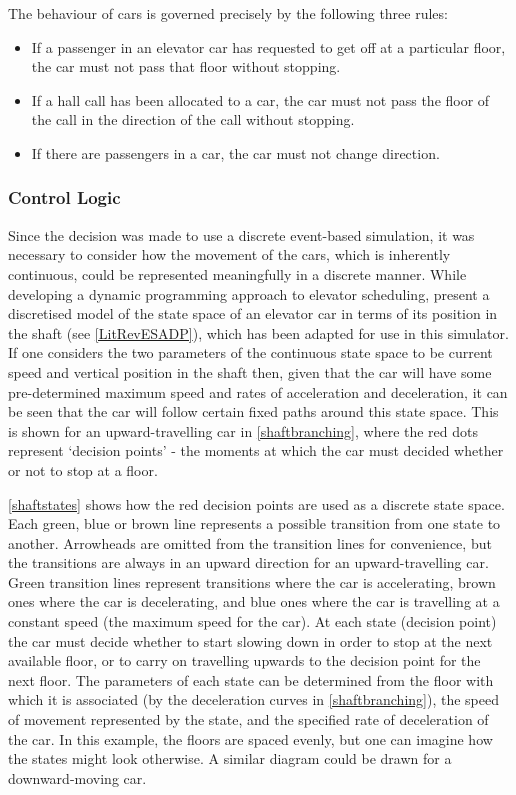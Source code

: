 \documentclass{UoYCSproject}
\begin{document}
The behaviour of cars is governed precisely by the following three rules:
\begin{itemize}
	\item If a passenger in an elevator car has requested to get off at a particular floor, the car must not pass that floor without stopping.
	\item If a hall call has been allocated to a car, the car must not pass the floor of the call in the direction of the call without stopping.
	\item If there are passengers in a car, the car must not change direction.
\end{itemize}

\subsubsection{Control Logic}

Since the decision was made to use a discrete event-based simulation, it was necessary to consider how the movement of the cars, which is inherently continuous, could be represented meaningfully in a discrete manner.  While developing a dynamic programming approach to elevator scheduling, \citet{Nikovski2003} present a discretised model of the state space of an elevator car in terms of its position in the shaft (see \autoref{LitRevESADP}), which has been adapted for use in this simulator.  If one considers the two parameters of the continuous state space to be current speed and vertical position in the shaft then, given that the car will have some pre-determined maximum speed and rates of acceleration and deceleration, it can be seen that the car will follow certain fixed paths around this state space.  This is shown for an upward-travelling car in \autoref{shaftbranching}, where the red dots represent `decision points' - the moments at which the car must decided whether or not to stop at a floor.

\autoref{shaftstates} shows how the red decision points are used as a discrete state space.  Each green, blue or brown line represents a possible transition from one state to another.  Arrowheads are omitted from the transition lines for convenience, but the transitions are always in an upward direction for an upward-travelling car.  Green transition lines represent transitions where the car is accelerating, brown ones where the car is decelerating, and blue ones where the car is travelling at a constant speed (the maximum speed for the car).  At each state (decision point) the car must decide whether to start slowing down in order to stop at the next available floor, or to carry on travelling upwards to the decision point for the next floor.  The parameters of each state can be determined from the floor with which it is associated (by the deceleration curves in \autoref{shaftbranching}), the speed of movement represented by the state, and the specified rate of deceleration of the car.  In this example, the floors are spaced evenly, but one can imagine how the states might look otherwise.  A similar diagram could be drawn for a downward-moving car.
\end{document}

